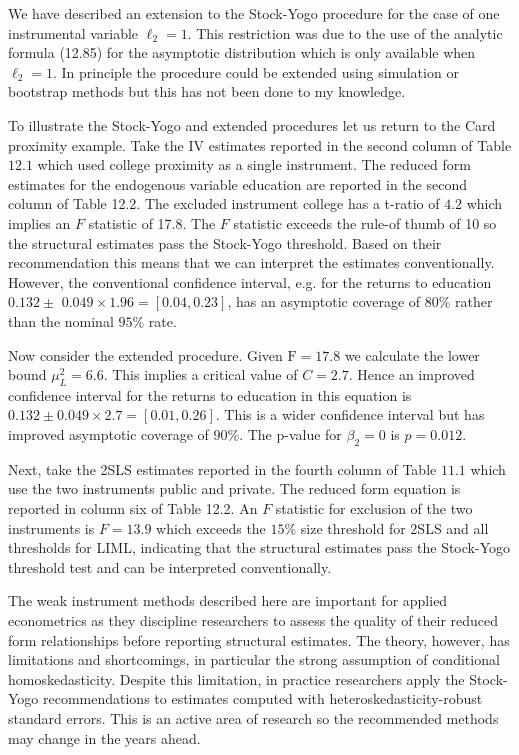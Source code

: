 \documentclass[10pt]{article}
\begin{document}
We have described an extension to the Stock-Yogo procedure for the case of one instrumental variable $\ell_{2}=1$. This restriction was due to the use of the analytic formula (12.85) for the asymptotic distribution which is only available when $\ell_{2}=1$. In principle the procedure could be extended using simulation or bootstrap methods but this has not been done to my knowledge.

To illustrate the Stock-Yogo and extended procedures let us return to the Card proximity example. Take the IV estimates reported in the second column of Table $12.1$ which used college proximity as a single instrument. The reduced form estimates for the endogenous variable education are reported in the second column of Table 12.2. The excluded instrument college has a t-ratio of $4.2$ which implies an $F$ statistic of 17.8. The $F$ statistic exceeds the rule-of thumb of 10 so the structural estimates pass the Stock-Yogo threshold. Based on their recommendation this means that we can interpret the estimates conventionally. However, the conventional confidence interval, e.g. for the returns to education $0.132 \pm$ $0.049 \times 1.96=[0.04,0.23]$, has an asymptotic coverage of $80 \%$ rather than the nominal $95 \%$ rate.

Now consider the extended procedure. Given $\mathrm{F}=17.8$ we calculate the lower bound $\mu_{L}^{2}=6.6$. This implies a critical value of $C=2.7$. Hence an improved confidence interval for the returns to education in this equation is $0.132 \pm 0.049 \times 2.7=[0.01,0.26]$. This is a wider confidence interval but has improved asymptotic coverage of $90 \%$. The p-value for $\beta_{2}=0$ is $p=0.012$.

Next, take the 2SLS estimates reported in the fourth column of Table $11.1$ which use the two instruments public and private. The reduced form equation is reported in column six of Table 12.2. An $F$ statistic for exclusion of the two instruments is $F=13.9$ which exceeds the $15 \%$ size threshold for 2SLS and all thresholds for LIML, indicating that the structural estimates pass the Stock-Yogo threshold test and can be interpreted conventionally.

The weak instrument methods described here are important for applied econometrics as they discipline researchers to assess the quality of their reduced form relationships before reporting structural estimates. The theory, however, has limitations and shortcomings, in particular the strong assumption of conditional homoskedasticity. Despite this limitation, in practice researchers apply the Stock-Yogo recommendations to estimates computed with heteroskedasticity-robust standard errors. This is an active area of research so the recommended methods may change in the years ahead.
\end{document}
